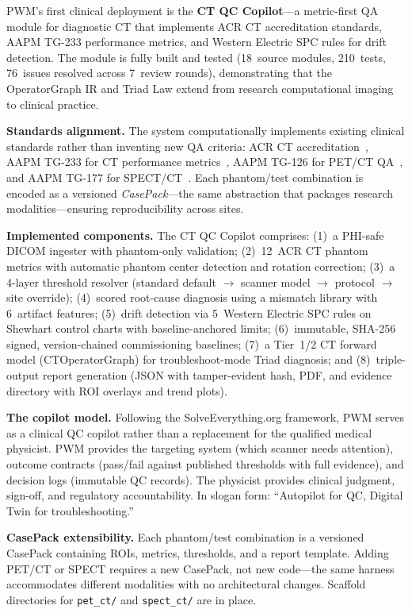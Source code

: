 PWM's first clinical deployment is the \textbf{CT QC Copilot}---a
metric-first QA module for diagnostic CT that implements ACR CT
accreditation standards, AAPM TG-233 performance metrics, and Western
Electric SPC rules for drift detection.  The module is fully built and
tested (18~source modules, 210~tests, 76~issues resolved across 7~review
rounds), demonstrating that the OperatorGraph IR and Triad Law extend
from research computational imaging to clinical practice.

\medskip
\noindent
\textbf{Standards alignment.}
The system computationally implements existing clinical standards rather
than inventing new QA criteria: ACR CT
accreditation~\cite{acr_ct_accreditation}, AAPM TG-233 for CT
performance metrics~\cite{aapm_tg233}, AAPM TG-126 for PET/CT
QA~\cite{aapm_tg126}, and AAPM TG-177 for
SPECT/CT~\cite{aapm_tg177}.  Each phantom/test combination is encoded
as a versioned \emph{CasePack}---the same abstraction that packages
research modalities---ensuring reproducibility across sites.

\medskip
\noindent
\textbf{Implemented components.}
The CT QC Copilot comprises: (1)~a PHI-safe DICOM ingester with
phantom-only validation; (2)~12~ACR CT phantom metrics with automatic
phantom center detection and rotation correction; (3)~a 4-layer
threshold resolver (standard default $\to$ scanner model $\to$ protocol
$\to$ site override); (4)~scored root-cause diagnosis using a mismatch
library with 6~artifact features; (5)~drift detection via 5~Western
Electric SPC rules on Shewhart control charts with baseline-anchored
limits; (6)~immutable, SHA-256 signed, version-chained commissioning
baselines; (7)~a Tier~1/2 CT forward model (CTOperatorGraph) for
troubleshoot-mode Triad diagnosis; and (8)~triple-output report
generation (JSON with tamper-evident hash, PDF, and evidence directory
with ROI overlays and trend plots).

\medskip
\noindent
\textbf{The copilot model.}
Following the SolveEverything.org framework, PWM serves as a clinical QC
copilot rather than a replacement for the qualified medical physicist.
PWM provides the targeting system (which scanner needs attention),
outcome contracts (pass/fail against published thresholds with full
evidence), and decision logs (immutable QC records).  The physicist
provides clinical judgment, sign-off, and regulatory accountability.  In
slogan form: ``Autopilot for QC, Digital Twin for troubleshooting.''

\medskip
\noindent
\textbf{CasePack extensibility.}
Each phantom/test combination is a versioned CasePack containing ROIs,
metrics, thresholds, and a report template.  Adding PET/CT or SPECT
requires a new CasePack, not new code---the same harness accommodates
different modalities with no architectural changes.  Scaffold directories
for \texttt{pet\_ct/} and \texttt{spect\_ct/} are in place.


